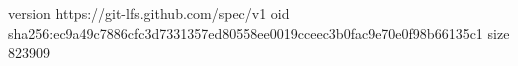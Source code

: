 version https://git-lfs.github.com/spec/v1
oid sha256:ec9a49c7886cfc3d7331357ed80558ee0019cceec3b0fac9e70e0f98b66135c1
size 823909
